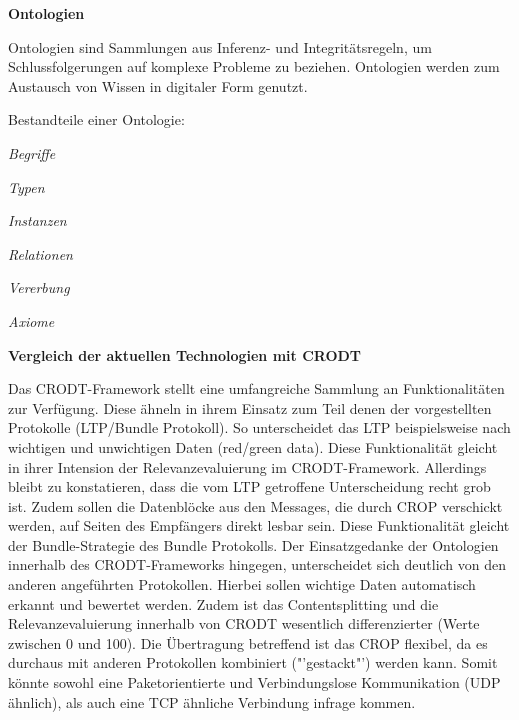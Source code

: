 \textbf{Ontologien}

Ontologien sind Sammlungen aus Inferenz- und Integrit{\"a}tsregeln, um
Schlussfolgerungen auf komplexe Probleme zu beziehen. Ontologien werden zum
Austausch von Wissen in digitaler Form genutzt.

Bestandteile einer Ontologie:

 \begin{compactenum}[I]
     \item \textit{Begriffe}
     \item \textit{Typen}
     \item \textit{Instanzen}
     \item \textit{Relationen}
     \item \textit{Vererbung}
     \item \textit{Axiome}
   \end{compactenum}
\newpage   
\textbf{Vergleich der aktuellen Technologien mit CRODT}

Das CRODT-Framework stellt eine umfangreiche Sammlung an Funktionalit{\"a}ten
zur Verf{\"u}gung. Diese {\"a}hneln in ihrem Einsatz zum Teil denen der
vorgestellten Protokolle (LTP/Bundle Protokoll). So unterscheidet das LTP
beispielsweise nach wichtigen und unwichtigen Daten (red/green data). Diese
Funktionalit{\"a}t gleicht in ihrer Intension der Relevanzevaluierung im
CRODT-Framework. Allerdings bleibt zu konstatieren, dass die vom LTP getroffene
Unterscheidung recht grob ist. Zudem sollen die
Datenbl{\"o}cke aus den Messages, die durch CROP verschickt werden, auf Seiten
des Empf{\"a}ngers direkt lesbar sein. Diese Funktionalit{\"a}t gleicht der
Bundle-Strategie des Bundle Protokolls. Der Einsatzgedanke der Ontologien
innerhalb des CRODT-Frameworks hingegen, unterscheidet sich deutlich von den
anderen angef{\"u}hrten Protokollen. Hierbei sollen wichtige Daten automatisch
erkannt und bewertet werden. Zudem ist das Contentsplitting und die
Relevanzevaluierung innerhalb von CRODT wesentlich differenzierter (Werte
zwischen 0 und 100). Die {\"U}bertragung betreffend ist das CROP flexibel, da es
durchaus mit anderen Protokollen kombiniert ("'gestackt"') werden kann. Somit
k{\"o}nnte sowohl eine Paketorientierte und Verbindungslose Kommunikation (UDP
{\"a}hnlich), als auch eine TCP {\"a}hnliche Verbindung infrage kommen.
